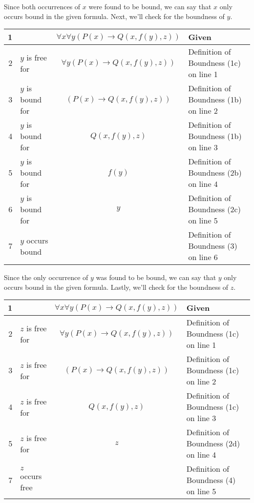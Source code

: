 \documentclass[11pt]{article}
\begin{document}
Since both occurrences of $x$ were found to be bound, we can say that $x$ only occurs bound in the given formula. Next, we'll check for the boundness of $y$.
\begin{center}
    \begin{tabular}{|r|l c|l|}
    \hline
        1 & & $\forall x \forall y (P(x) \rightarrow Q(x, f(y), z))$ & Given \\
        \hline
        2 & $y$ is free for & $\forall y (P(x) \rightarrow Q(x, f(y), z))$ & Definition of Boundness (1c) on line 1 \\
        \hline
        3 & $y$ is bound for & $(P(x) \rightarrow Q(x, f(y), z))$ & Definition of Boundness (1b) on line 2 \\
        \hline
        4 & $y$ is bound for & $Q(x, f(y), z)$ & Definition of Boundness (1b) on line 3 \\
        \hline
        5 & $y$ is bound for & $f(y)$ & Definition of Boundness (2b) on line 4 \\
        \hline
        6 & $y$ is bound for & $y$ & Definition of Boundness (2c) on line 5 \\
        \hline
        7 & $y$ occurs bound & & Definition of Boundness (3) on line 6 \\
        \hline
    \end{tabular}
\end{center}

Since the only occurrence of $y$ was found to be bound, we can say that $y$ only occurs bound in the given formula. Lastly, we'll check for the boundness of $z$.

\begin{center}
    \begin{tabular}{|r|l c|l|}
    \hline
        1 & & $\forall x \forall y (P(x) \rightarrow Q(x, f(y), z))$ & Given \\
        \hline
        2 & $z$ is free for & $\forall y (P(x) \rightarrow Q(x, f(y), z))$ & Definition of Boundness (1c) on line 1 \\
        \hline
        3 & $z$ is free for & $(P(x) \rightarrow Q(x, f(y), z))$ & Definition of Boundness (1c) on line 2 \\
        \hline
        4 & $z$ is free for & $Q(x, f(y), z)$ & Definition of Boundness (1c) on line 3 \\
        \hline
        5 & $z$ is free for & $z$ & Definition of Boundness (2d) on line 4 \\
        \hline
        7 & $z$ occurs free &&  Definition of Boundness (4) on line 5 \\
        \hline
    \end{tabular}
\end{center}
\end{document}
